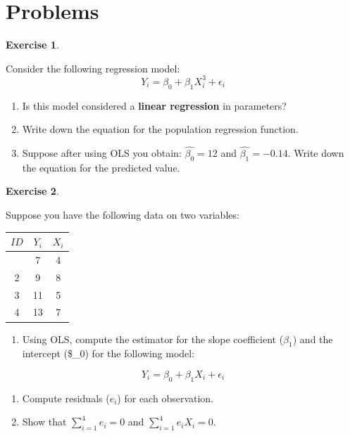 \documentclass[
]{book}
\providecommand{\tightlist}{%
  \setlength{\itemsep}{0pt}\setlength{\parskip}{0pt}}
\theoremstyle{definition}
\theoremstyle{definition}
\theoremstyle{definition}
\newtheorem{exercise}{Exercise}[chapter]
\theoremstyle{definition}
\theoremstyle{remark}
\begin{document}
\hypertarget{problems}{%
\section*{Problems}\label{problems}}

\begin{exercise}
\protect\hypertarget{exr:unnamed-chunk-15}{}\label{exr:unnamed-chunk-15}

Consider the following regression model:\[Y_i= \beta_0 + \beta_1 X_i^3 + \epsilon_i\]

\begin{enumerate}
\def\labelenumi{\alph{enumi}.}
\item
  Is this model considered a \textbf{linear regression} in parameters?
\item
  Write down the equation for the population regression function.
\item
  Suppose after using OLS you obtain: \(\hat{\beta_0}=12\) and \(\hat{\beta_1}=-0.14\). Write down the equation for the predicted value.
\end{enumerate}

\end{exercise}

\begin{exercise}
\protect\hypertarget{exr:unnamed-chunk-16}{}\label{exr:unnamed-chunk-16}

Suppose you have the following data on two variables:

\begin{longtable}[]{@{}ccc@{}}
\toprule\noalign{}
\(ID\) & \(Y_i\) & \(X_i\) \\
\midrule\noalign{}
\endhead
\bottomrule\noalign{}
\endlastfoot
1 & 7 & 4 \\
2 & 9 & 8 \\
3 & 11 & 5 \\
4 & 13 & 7 \\
\end{longtable}

\begin{enumerate}
\def\labelenumi{\alph{enumi}.}
\tightlist
\item
  Using OLS, compute the estimator for the slope coefficient (\(\beta_1\)) and the intercept (\$\beta\_0) for the following model:
\end{enumerate}

\[Y_i = \beta_0 + \beta_1 X_i + \epsilon_i\]

\begin{enumerate}
\def\labelenumi{\alph{enumi}.}
\setcounter{enumi}{1}
\item
  Compute residuals (\(e_i\)) for each observation.
\item
  Show that \(\sum_{i=1}^4 e_i=0\) and \(\sum_{i=1}^4 e_iX_i=0\).
\end{enumerate}

\end{exercise}
\end{document}
